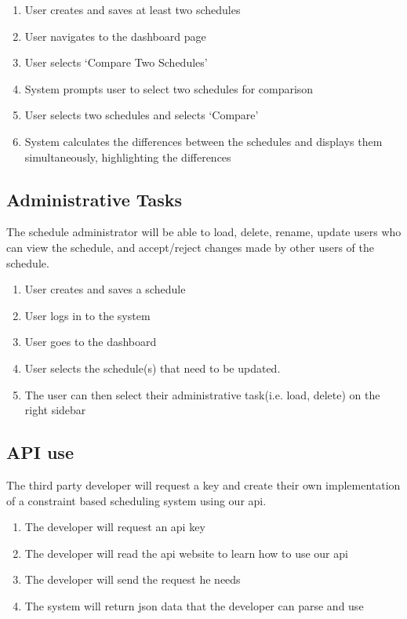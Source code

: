 \documentclass{extarticle}
\begin{document}
\begin{enumerate}
\item User creates and saves at least two schedules
\item User navigates to the dashboard page
\item User selects `Compare Two Schedules'
\item System prompts user to select two schedules for comparison
\item User selects two schedules and selects `Compare'
\item System calculates the differences between the schedules and displays them simultaneously, highlighting the
differences
\end{enumerate}

  
\subsection{Administrative Tasks}
The schedule administrator will be able to load, delete, rename, update users who can view the schedule, and accept/reject 
changes made by other users of the schedule.
\begin{enumerate}
\item User creates and saves a schedule
\item User logs in to the system
\item User goes to the dashboard
\item User selects the schedule(s) that need to be updated.
\item The user can then select their administrative task(i.e. load, delete) on the right sidebar
\end{enumerate}


\subsection{API use}
The third party developer will request a key and create their own implementation of a constraint based scheduling 
system using our api.

\begin{enumerate}
\item The developer will request an api key
\item The developer will read the api website to learn how to use our api
\item The developer will send the request he needs
\item The system will return json data that the developer can parse and use
\end{enumerate}
\end{document}
